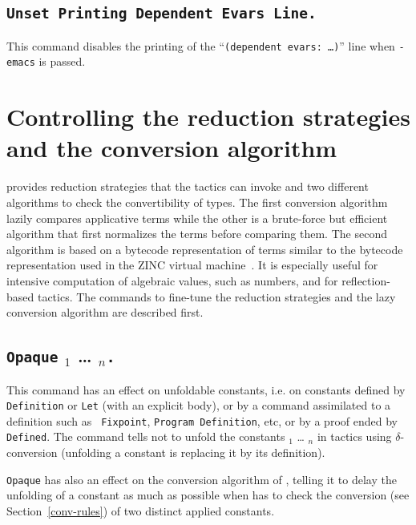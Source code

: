 \subsection[\tt Unset Printing Dependent Evars Line.]{\tt Unset Printing Dependent Evars Line.}
This command disables the printing of the ``{\tt (dependent evars: \ldots)}''
line when {\tt -emacs} is passed.


\section{Controlling the reduction strategies and the conversion algorithm}
\label{Controlling_reduction_strategy}

{\Coq} provides reduction strategies that the tactics can invoke and
two different algorithms to check the convertibility of types.
The first conversion algorithm lazily
compares applicative terms while the other is a brute-force but efficient
algorithm that first normalizes the terms before comparing them.  The
second algorithm is based on a bytecode representation of terms
similar to the bytecode representation used in the ZINC virtual
machine~\cite{Leroy90}. It is especially useful for intensive
computation of algebraic values, such as numbers, and for reflection-based
tactics. The commands to fine-tune the reduction strategies and the
lazy conversion algorithm are described first.

\subsection[{\tt Opaque} \qualid$_1$ {\ldots} \qualid$_n${\tt .}]{{\tt Opaque} \qualid$_1$ {\ldots} \qualid$_n${\tt .}\label{Opaque}}
This command has an effect on unfoldable constants, i.e.
on constants defined by {\tt Definition} or {\tt Let} (with an explicit
body), or by a command assimilated to a definition such as {\tt
Fixpoint}, {\tt Program Definition}, etc, or by a proof ended by {\tt
Defined}. The command tells not to unfold
the constants {\qualid$_1$} {\ldots} {\qualid$_n$} in tactics using
$\delta$-conversion (unfolding a constant is replacing it by its
definition).

{\tt Opaque} has also an effect on the conversion algorithm of {\Coq},
telling it to delay the unfolding of a constant as much as possible when
{\Coq} has to check the conversion (see Section~\ref{conv-rules})
of two distinct applied constants.

